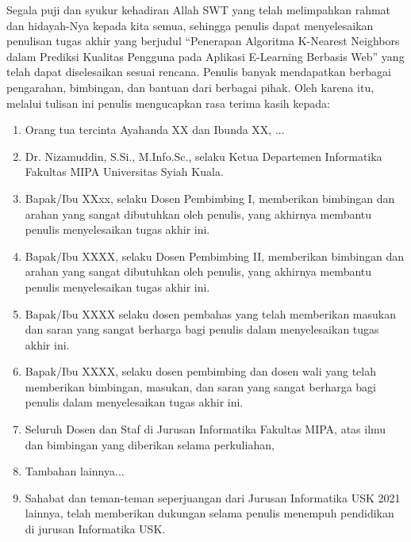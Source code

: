 \preface %

Segala puji dan syukur kehadiran Allah SWT yang telah melimpahkan rahmat
dan hidayah-Nya kepada kita semua, sehingga penulis dapat menyelesaikan penulisan tugas akhir yang berjudul “Penerapan Algoritma K-Nearest Neighbors dalam Prediksi Kualitas Pengguna pada Aplikasi E-Learning Berbasis Web” yang telah dapat diselesaikan sesuai rencana. Penulis banyak mendapatkan berbagai pengarahan, bimbingan, dan bantuan dari berbagai pihak. Oleh karena itu, melalui tulisan ini penulis mengucapkan rasa terima kasih kepada:

\begin{enumerate}
    \item Orang tua tercinta Ayahanda XX dan Ibunda XX, ...
    
    \item Dr. Nizamuddin, S.Si., M.Info.Sc., selaku Ketua Departemen Informatika Fakultas MIPA Universitas Syiah Kuala.
    
    \item Bapak/Ibu XXxx,  selaku Dosen Pembimbing I, memberikan bimbingan dan arahan yang sangat dibutuhkan oleh penulis, yang akhirnya membantu penulis menyelesaikan tugas akhir ini.
    
    \item Bapak/Ibu XXXX, selaku Dosen Pembimbing II, memberikan bimbingan dan arahan yang sangat dibutuhkan oleh penulis, yang akhirnya membantu penulis menyelesaikan tugas akhir ini.
    
    \item Bapak/Ibu XXXX selaku dosen pembahas yang telah memberikan masukan dan saran yang sangat berharga bagi penulis dalam menyelesaikan tugas akhir ini.
    
    \item  Bapak/Ibu XXXX, selaku dosen pembimbing dan dosen wali yang telah memberikan bimbingan, masukan, dan saran yang sangat berharga bagi penulis dalam menyelesaikan tugas akhir ini. 
    
    \item Seluruh Dosen dan Staf di Jurusan Informatika Fakultas MIPA, atas ilmu dan bimbingan yang diberikan selama perkuliahan, 
    
    \item Tambahan lainnya...
    
    \item Sahabat dan teman-teman seperjuangan dari Jurusan Informatika USK 2021 lainnya, telah memberikan dukungan selama penulis menempuh pendidikan di jurusan Informatika USK.
\end{enumerate}


